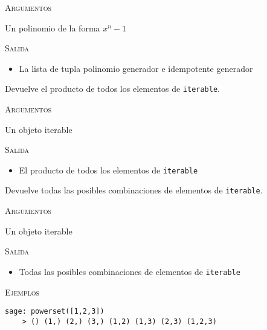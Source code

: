 \begin{description}[font=\ttfamily, style=nextline]
  \textsc{Argumentos}
  \begin{description}[font=\normalfont\ttfamily]
    \item[poly] Un polinomio de la forma \(x^n - 1\)
  \end{description}

  \textsc{Salida}
  \begin{itemize}
    \item La lista de tupla polinomio generador e idempotente generador
  \end{itemize}

  \item[mult(iterable)] Devuelve el producto de todos los elementos de \texttt{iterable}.
  
  \textsc{Argumentos}
  \begin{description}[font=\normalfont\ttfamily]
    \item[iterable] Un objeto iterable
  \end{description}

  \textsc{Salida}
  \begin{itemize}
    \item El producto de todos los elementos de \texttt{iterable}
  \end{itemize}

  \item[powerset(iterable)] Devuelve todas las posibles combinaciones de elementos de \texttt{iterable}.
  
  \textsc{Argumentos}
  \begin{description}[font=\normalfont\ttfamily]
    \item[iterable] Un objeto iterable
  \end{description}

  \textsc{Salida}
  \begin{itemize}
    \item Todas las posibles combinaciones de elementos de \texttt{iterable}
  \end{itemize}

  \textsc{Ejemplos}
  \begin{lstlisting}[gobble=4]
    sage: powerset([1,2,3])
    > () (1,) (2,) (3,) (1,2) (1,3) (2,3) (1,2,3)
  \end{lstlisting}

\end{description}